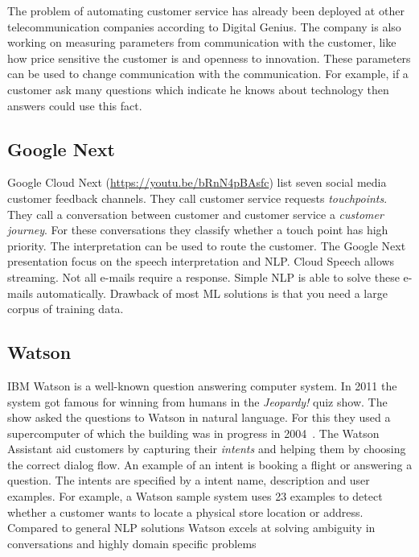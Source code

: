 The problem of automating customer service has already been deployed at other telecommunication companies according to Digital Genius.
The company is also working on measuring parameters from communication with the customer, like how price sensitive the customer is and openness to innovation.
These parameters can be used to change communication with the communication.
For example, if a customer ask many questions which indicate he knows about technology then answers could use this fact.

\subsection{Google Next}
\label{subsec:google_next}
Google Cloud Next (\url{https://youtu.be/bRnN4pBAsfc}) list seven social media customer feedback channels.
They call customer service requests \textit{touchpoints}.
They call a conversation between customer and customer service a \textit{customer journey}.
For these conversations they classify whether a touch point has high priority.
The interpretation can be used to route the customer.
The Google Next presentation focus on the speech interpretation and NLP.
Cloud Speech allows streaming.
Not all e-mails require a response.
Simple NLP is able to solve these e-mails automatically.
Drawback of most ML solutions is that you need a large corpus of training data. \\


\subsection{Watson}
IBM Watson is a well-known question answering computer system.
In 2011 the system got famous for winning from humans in the \textit{Jeopardy!} quiz show.
The show asked the questions to Watson in natural language.
For this they used a supercomputer of which the building was in progress in 2004~\cite{bhanot2004qcd}.
The Watson Assistant aid customers by capturing their \textit{intents} and helping them by choosing the correct dialog flow.
An example of an intent is booking a flight or answering a question.
The intents are specified by a intent name, description and user examples.
For example, a Watson sample system uses 23 examples to detect whether a customer wants to locate a physical store location or address.  \\

Compared to general NLP solutions Watson excels at solving ambiguity in conversations and highly domain specific problems 

